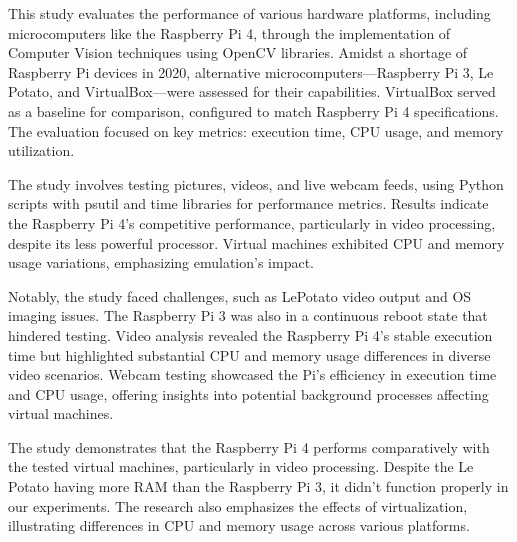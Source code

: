 This study evaluates the performance of various hardware platforms, including microcomputers like the Raspberry Pi 4, through the implementation of Computer Vision techniques using OpenCV libraries. Amidst a shortage of Raspberry Pi devices in 2020, alternative microcomputers—Raspberry Pi 3, Le Potato, and VirtualBox—were assessed for their capabilities. VirtualBox served as a baseline for comparison, configured to match Raspberry Pi 4 specifications. The evaluation focused on key metrics: execution time, CPU usage, and memory utilization.

The study involves testing pictures, videos, and live webcam feeds, using Python scripts with psutil and time libraries for performance metrics. Results indicate the Raspberry Pi 4's competitive performance, particularly in video processing, despite its less powerful processor. Virtual machines exhibited CPU and memory usage variations, emphasizing emulation's impact.

Notably, the study faced challenges, such as LePotato video output and OS imaging issues. The Raspberry Pi 3 was also in a continuous reboot state that hindered testing. Video analysis revealed the Raspberry Pi 4's stable execution time but highlighted substantial CPU and memory usage differences in diverse video scenarios. Webcam testing showcased the Pi's efficiency in execution time and CPU usage, offering insights into potential background processes affecting virtual machines.

The study demonstrates that the Raspberry Pi 4 performs comparatively with the tested virtual machines, particularly in video processing. Despite the Le Potato having more RAM than the Raspberry Pi 3, it didn't function properly in our experiments. The research also emphasizes the effects of virtualization, illustrating differences in CPU and memory usage across various platforms.
